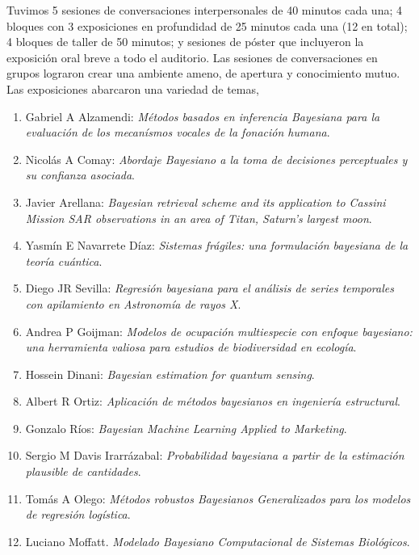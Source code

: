 \documentclass[a4paper,11pt]{book}
\theoremstyle{definition}
\begin{document}
Tuvimos 5 sesiones de conversaciones interpersonales de 40 minutos cada una; 4 bloques con 3 exposiciones en profundidad de 25 minutos cada una (12 en total); 4 bloques de taller de 50 minutos; y sesiones de p\'oster que incluyeron la exposici\'on oral breve a todo el auditorio.
%
Las sesiones de conversaciones en grupos lograron crear una ambiente ameno, de apertura y conocimiento mutuo.
%
Las exposiciones abarcaron una variedad de temas,
%
\begin{enumerate} \setlength\itemsep{-0.05cm} \small
\item Gabriel A Alzamendi: \emph{M\'etodos basados en inferencia Bayesiana para la evaluaci\'on de los mecan\'ismos vocales de la fonaci\'on humana}.

\item Nicol\'as A Comay: \emph{Abordaje Bayesiano a la toma de decisiones perceptuales y su confianza asociada}.

\item Javier Arellana: \emph{Bayesian retrieval scheme and its application to Cassini Mission SAR observations in an area of Titan, Saturn's largest moon}.


\item Yasm\'in E Navarrete D\'iaz: \emph{Sistemas fr\'agiles: una formulaci\'on bayesiana de la teor\'ia cu\'antica}.


\item Diego JR Sevilla: \emph{Regresi\'on bayesiana para el an\'alisis de series temporales con apilamiento en Astronom\'ia de rayos X}.

\item Andrea P Goijman: \emph{Modelos de ocupaci\'on multiespecie con enfoque bayesiano: una herramienta valiosa para estudios de biodiversidad en ecolog\'ia}.

\item Hossein Dinani: \emph{Bayesian estimation for quantum sensing}.


\item Albert R Ortiz: \emph{Aplicaci\'on de m\'etodos bayesianos en ingenier\'ia estructural}.

\item Gonzalo R\'ios: \emph{Bayesian Machine Learning Applied to Marketing}.

\item Sergio M Davis Irarr\'azabal: \emph{Probabilidad bayesiana a partir de la estimaci\'on plausible de cantidades}.

\item Tom\'as A Olego: \emph{M\'etodos robustos Bayesianos Generalizados para los modelos de regresi\'on log\'istica}.

\item Luciano Moffatt. \emph{Modelado Bayesiano Computacional de Sistemas Biol\'ogicos}.
\end{enumerate}
\end{document}
